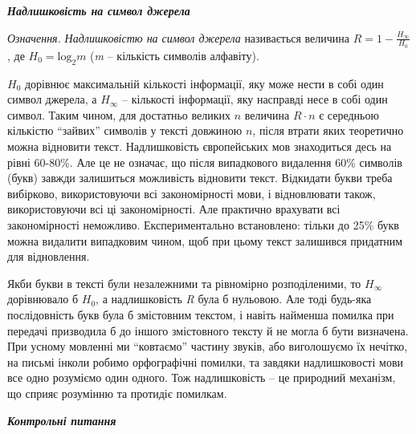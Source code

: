 \documentclass[a4paper]{article}
\newcounter{}
\begin{document}
\bigskip


\bigskip

{\centering\bfseries\itshape
Надлишковість на символ джерела
\par}


\bigskip


\bigskip

\textit{Означення.} \textit{Надлишковістю на символ джерела} називається
величина  ${R=1-\frac{H_{{\infty }}}{H_{{0}}}}$, де 
${H_{{0}}=\text{log}_{{2}}m}$ (\textit{m} – кількість символів алфавіту).

 ${H_{{0}}}$ дорівнює максимальній кількості інформації, яку може нести в собі
один символ джерела, а  ${H_{{\infty }}}$ – кількості інформації, яку насправді
несе в собі один символ. Таким чином, для достатньо великих  ${n}$ величина 
${R\cdot n}$ є середньою кількістю “зайвих” символів у тексті довжиною  ${n}$,
після втрати яких теоретично можна відновити текст. Надлишковість європейських
мов знаходиться десь на рівні 60-80\%. Але це не означає, що після випадкового
видалення 60\% символів (букв) завжди залишиться можливість відновити текст.
Відкидати букви треба вибірково, використовуючи всі закономірності мови, і
відновлювати також, використовуючи всі ці закономірності. Але практично
врахувати всі закономірності неможливо. Експериментально встановлено: тільки до
25\% букв можна видалити випадковим чином, щоб при цьому текст залишився
придатним для відновлення.

Якби букви в тексті були незалежними та рівномірно розподіленими, то 
${H_{{\infty }}}$ дорівнювало б  ${H_{{0}}}$, а надлишковість  \textit{R} була
б нульовою. Але тоді будь-яка послідовність букв була б змістовним текстом, і
навіть найменша помилка при передачі  призводила б до іншого змістовного тексту
й не могла б бути визначена. При усному мовленні ми “ковтаємо” частину звуків,
або виголошуємо їх нечітко, на письмі інколи робимо орфографічні помилки, та
завдяки  надлишковості мови все одно розуміємо один одного. Тож надлишковість –
це природний механізм, що сприяє розумінню та протидіє помилкам.


\bigskip


\bigskip

{\centering\bfseries\itshape
Контрольні питання
\par}


\bigskip


\bigskip
\end{document}

